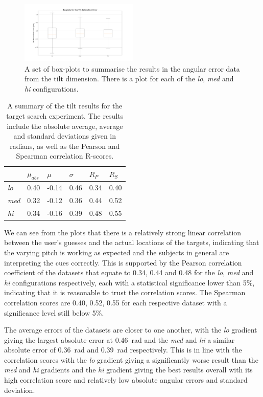 \documentclass[format=sigconf, review=true, screen=true, anonymous=true]{acmart}
\begin{document}
\begin{figure}
  \centering
  \includegraphics[width=0.5\textwidth]{figures/tilt_err_boxplot.png}
  \caption{A set of box-plots to summarise the results in the angular error data from the tilt dimension. There is a plot for each of the \emph{lo}, \emph{med} and \emph{hi} configurations. }
  \label{fig:tilt-boxplots}
\end{figure}

\begin{table}
  \centering
  \caption{A summary of the tilt results for the target search experiment. The results include the absolute average, average and standard deviations given in radians, as well as the Pearson and Spearman correlation R-scores.}
  \label{tab:tilt-results}
  \begin{tabular}{|l|l|l|l|l|l|}
    \hline
    & $\mu_{abs}$ & $\mu$ & $\sigma$ & $R_{P}$ & $R_{S}$ \\\hline\hline
    \emph{lo}  & 0.40 & -0.14 & 0.46 & 0.34 & 0.40 \\\hline
    \emph{med} & 0.32 & -0.12 & 0.36 & 0.44 & 0.52 \\\hline
    \emph{hi}  & 0.34 & -0.16 & 0.39 & 0.48 & 0.55 \\\hline
  \end{tabular}
\end{table}

We can see from the plots that there is a relatively strong linear correlation between the user's guesses and the actual locations of the targets, indicating that the varying pitch is working as expected and the subjects in general are interpreting the cues correctly. This is supported by the Pearson correlation coefficient of the datasets that equate to 0.34, 0.44 and 0.48 for the \emph{lo}, \emph{med} and \emph{hi} configurations respectively, each with a statistical significance lower than 5\%, indicating that it is reasonable to trust the correlation scores. The Spearman correlation scores are 0.40, 0.52, 0.55 for each respective dataset with a significance level still below 5\%. 

The average errors of the datasets are closer to one another, with the \emph{lo} gradient giving the largest absolute error at \SI{0.46}{\radian} and the \emph{med} and \emph{hi} a similar absolute error of \SI{0.36}{\radian} and \SI{0.39}{\radian} respectively. This is in line with the correlation scores with the \emph{lo} gradient giving a significantly worse result than the \emph{med} and \emph{hi} gradients and the \emph{hi} gradient giving the best results overall with its high correlation score and relatively low absolute angular errors and standard deviation. 
\end{document}
